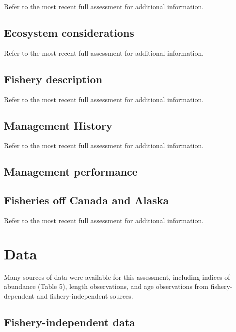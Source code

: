 \documentclass[
]{scrartcl}
\begin{document}
Refer to the most recent full assessment for additional information.

\subsection{Ecosystem considerations}\label{ecosystem-considerations-1}

Refer to the most recent full assessment for additional information.

\subsection{Fishery description}\label{fishery-description}

Refer to the most recent full assessment for additional information.

\subsection{Management History}\label{management-history}

Refer to the most recent full assessment for additional information.

\subsection{Management performance}\label{management-performance-1}

\subsection{Fisheries off Canada and
Alaska}\label{fisheries-off-canada-and-alaska}

Refer to the most recent full assessment for additional information.

\newpage{}

\section{Data}\label{data}

Many sources of data were available for this assessment, including
indices of abundance (Table 5), length observations, and age
observations from fishery-dependent and fishery-independent sources.

\subsection{Fishery-independent data}\label{fishery-independent-data}
\end{document}
